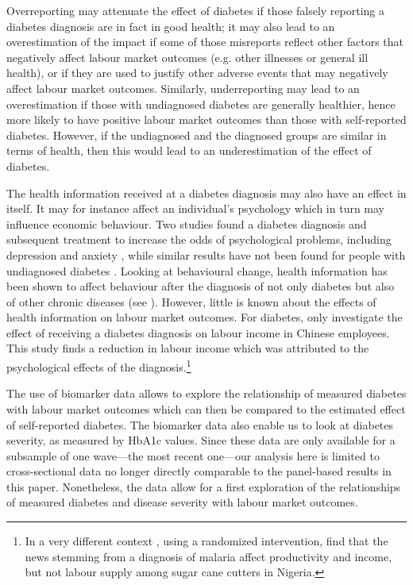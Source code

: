 Overreporting may attenuate the effect of diabetes if those falsely reporting a diabetes diagnosis are in fact in good health; it may also lead to an overestimation of the impact if some of those misreports reflect other factors that negatively affect labour market outcomes (e.g. other illnesses or general ill health), or if they are used to justify other adverse events that may negatively affect labour market outcomes. Similarly, underreporting may lead to an overestimation if those with undiagnosed diabetes are generally healthier, hence more likely to have positive labour market outcomes than those with self-reported diabetes. However, if the undiagnosed and the diagnosed groups are similar in terms of health, then this would lead to an underestimation of the effect of diabetes. 

The health information received at a diabetes diagnosis may also have an effect in itself. It may for instance affect an individual's psychology which in turn may influence economic behaviour. Two studies found a diabetes diagnosis and subsequent treatment to increase the odds of psychological problems, including depression and anxiety \parencite{Thoolen2006,Paddison2011}, while similar results have not been found for people with undiagnosed diabetes \parencite{Nouwen2011}. Looking at behavioural change, health information  has been shown to affect behaviour after the diagnosis of not only diabetes \parencite{Slade2012} but also of other chronic diseases (see \textcite{Baird2014,Gong2015,Thornton2008,Zhao2013a}). However, little is known about the effects of health information on labour market outcomes. For diabetes, only \textcite{Liu2014} investigate the effect of receiving a diabetes diagnosis on labour income in Chinese employees. This study finds a reduction in labour income which was attributed to the psychological effects of the diagnosis.\footnote{In a very different context \textcite{Dillon2014}, using a randomized intervention, find that the news stemming from a diagnosis of malaria affect productivity and income, but not labour supply among sugar cane cutters in Nigeria.} 


The use of biomarker data allows to explore the relationship of measured diabetes with labour market outcomes which can then be compared to the estimated effect of self-reported diabetes. The biomarker data also enable us to look at diabetes severity, as measured by \ac{HbA1c} values. Since these data are only available for a subsample of one wave---the most recent one---our analysis here is limited to cross-sectional data no longer directly comparable to the panel-based results in this paper. Nonetheless, the data allow for a first exploration of the relationships of measured diabetes and disease severity with labour market outcomes. 

